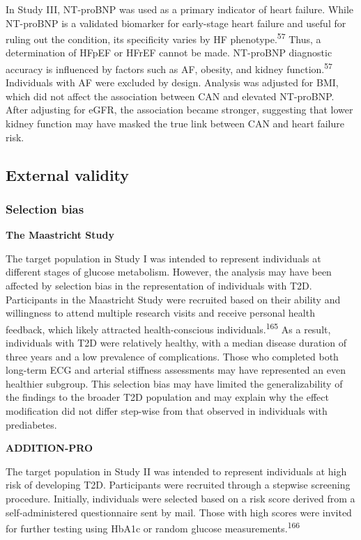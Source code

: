 \documentclass[
  a4paper,
  headsepline=true,
  open=left]{scrbook}
\begin{document}
In Study III, NT-proBNP was used as a primary indicator of heart
failure. While NT-proBNP is a validated biomarker for early-stage heart
failure and useful for ruling out the condition, its specificity varies
by HF phenotype.\textsuperscript{57} Thus, a determination of HFpEF or
HFrEF cannot be made. NT-proBNP diagnostic accuracy is influenced by
factors such as AF, obesity, and kidney function.\textsuperscript{57}
Individuals with AF were excluded by design. Analysis was adjusted for
BMI, which did not affect the association between CAN and elevated
NT-proBNP. After adjusting for eGFR, the association became stronger,
suggesting that lower kidney function may have masked the true link
between CAN and heart failure risk.

\hypertarget{external-validity}{%
\subsection{External validity}\label{external-validity}}

\hypertarget{selection-bias}{%
\subsubsection{Selection bias}\label{selection-bias}}

\textbf{The Maastricht Study}

The target population in Study I was intended to represent individuals
at different stages of glucose metabolism. However, the analysis may
have been affected by selection bias in the representation of
individuals with T2D. Participants in the Maastricht Study were
recruited based on their ability and willingness to attend multiple
research visits and receive personal health feedback, which likely
attracted health-conscious individuals.\textsuperscript{165} As a
result, individuals with T2D were relatively healthy, with a median
disease duration of three years and a low prevalence of complications.
Those who completed both long-term ECG and arterial stiffness
assessments may have represented an even healthier subgroup. This
selection bias may have limited the generalizability of the findings to
the broader T2D population and may explain why the effect modification
did not differ step-wise from that observed in individuals with
prediabetes.

\textbf{ADDITION-PRO}

The target population in Study II was intended to represent individuals
at high risk of developing T2D. Participants were recruited through a
stepwise screening procedure. Initially, individuals were selected based
on a risk score derived from a self-administered questionnaire sent by
mail. Those with high scores were invited for further testing using
HbA1c or random glucose measurements.\textsuperscript{166}
\end{document}
